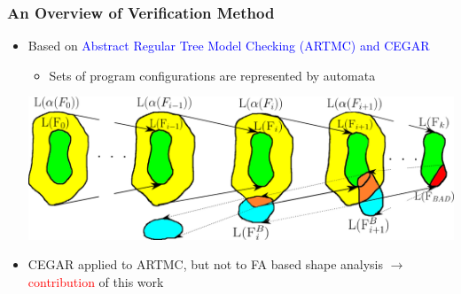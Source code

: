 \documentclass{beamer}
\newcommand{\hlbl}[1]{\textcolor{blue}{#1}}
\newcommand{\hlrd}[1]{\textcolor{red}{#1}}
\begin{document}
\begin{frame}
  \frametitle{An Overview of Verification Method}
   \begin{itemize}
	   \item Based on \hlbl{Abstract Regular Tree Model Checking (ARTMC) and CEGAR} 
		\begin{itemize}
			\item Sets of program configurations are represented by automata
		\end{itemize}
	   \vspace{0.2cm}
	   \includegraphics[scale=0.26]{artmc.png}
		   \pause
	   \item CEGAR applied to ARTMC, but not to FA
		   based shape analysis $\rightarrow$ \hlrd{contribution} of this work
  \end{itemize}
\end{frame}
\end{document}
